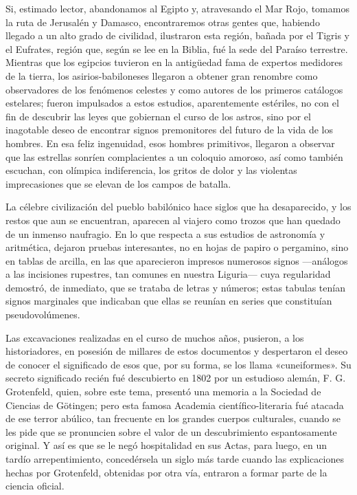 \documentclass[a4paper, 12pt, draft]{article}
\begin{document}
Si, estimado lector, abandonamos al Egipto y, atravesando el Mar Rojo, tomamos la ruta de Jerusalén y Damasco, encontraremos otras gentes que, habiendo llegado a un alto grado de civilidad, ilustraron esta región, bañada por el Tigris y el Eufrates, región que, según se lee en la Biblia, fué la 
sede del Paraíso terrestre. Mientras que los egipcios
tuvieron en la antigüedad fama de expertos medidores de la tierra, los asirios-babiloneses llegaron a obtener gran renombre como observadores de los fenómenos celestes y como autores de los primeros catálogos estelares; fueron impulsados a estos estudios, aparentemente estériles, no con el fin de descubrir las leyes que gobiernan el curso de los astros, sino por el inagotable deseo de encontrar signos premonitores del futuro de la vida de los hombres. En esa feliz ingenuidad, esos hombres primitivos, llegaron a observar que las estrellas sonríen complacientes a un coloquio amoroso, así como también escuchan, con olímpica indiferencia, los gritos de dolor y las violentas imprecasiones que se elevan de  los campos de batalla.

La célebre civilización del pueblo babilónico hace siglos que ha desaparecido, y los restos que aun se encuentran, aparecen al viajero como trozos que han quedado de un inmenso naufragio. En lo que respecta a sus estudios de astronomía y aritmética, dejaron pruebas interesantes, no en hojas de papiro o pergamino, sino en tablas de arcilla, en las que aparecieron impresos numerosos signos ---análogos a las incisiones rupestres, tan comunes en nuestra Liguria--- cuya regularidad demostró, de inmediato, que se trataba de letras y números; estas tabulas tenían signos marginales que indicaban que ellas se reunían en series que constituían pseudovolúmenes.

Las excavaciones realizadas en el curso de muchos años, pusieron, a los historiadores, en posesión de millares de estos documentos y despertaron el deseo de conocer el significado de esos que, por su forma, se los llama «cuneiformes». Su secreto significado recién fué descubierto en 1802 por un estudioso alemán, F. G. Grotenfeld, quien, sobre este tema, presentó una memoria a la Sociedad de Ciencias de Götingen; pero esta famosa Academia científico-literaria fué atacada de ese terror abúlico, tan frecuente en los grandes cuerpos culturales, cuando se les pide que se pronuncien sobre el valor de un descubrimiento espantosamente original. Y así es que se le negó hospitalidad en sus Actas, para luego, en un tardío arrepentimiento, concedérsela un siglo más tarde cuando las explicaciones hechas por Grotenfeld, obtenidas por otra vía, entraron a formar parte de la ciencia oficial.
\end{document}
